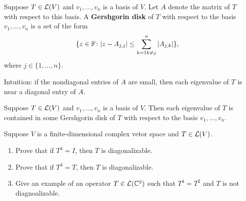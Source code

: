 \documentclass{extarticle}
\begin{document}
\begin{definition}
    Suppose \(T \in \mathcal{L}(V)\) and \(v_1, \ldots, v_n\) is a basis of \(V\). Let \(A\) denote the matrix 
    of \(T\) with respect to this basis. A \textbf{Gershgorin disk} of \(T\) with respect to the basis 
    \(v_1, \ldots, v_n\) is a set of the form 
    \[\{z \in \mathbb{F} \colon |z - A_{j,j}| \leq \sum_{k=1 k \neq j}^{n} |A_{j,k}| \},\]
    where \(j \in \{1, \ldots, n\}.\)
\end{definition}

\begin{remark}
    Intuition: if the nondiagonal entries of \(A\) are small, then each eigenvalue of \(T\) is near 
    a diagonal entry of \(A\).
\end{remark}

\begin{thm}
    Suppose \(T \in \mathcal{L}(V)\) and \(v_1, \ldots, v_n\) is a basis of \(V\). Then each eigenvalue of \(T\)
    is contained in some Gershgorin disk of \(T\) with respect to the basis \(v_1, \ldots, v_n\).
\end{thm}








\newpage 
{}


\begin{problem}{1}
    Suppose \(V\) is a finite-dimensional complex vetor space and \(T \in \mathcal{L}(V)\). 
    \begin{enumerate}[label=(\alph*)]
        \item Prove that if \(T^4 = I\), then \(T\) is diagonalizable. 
        \item Prove that if \(T^4 = T\), then \(T\) is diagonalizable. 
        \item Give an example of an operator \(T \in \mathcal{L}(\mathbb{C}^2)\) such that \(T^4 = T^2\) and \(T\) is not 
        diagnoalizable.
    \end{enumerate} 
\end{problem}
\end{document}

